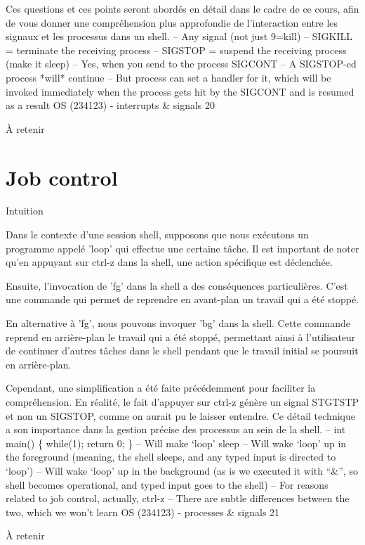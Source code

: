 \documentclass[12pt]{article}
\begin{document}
Ces questions et ces points seront abordés en détail dans le cadre de ce cours, afin de vous donner une compréhension plus approfondie de l'interaction entre les signaux et les processus dans un shell.
– Any signal (not just 9=kill)
– SIGKILL = terminate the receiving process
– SIGSTOP = suspend the receiving process (make it sleep)
– Yes, when you send to the process SIGCONT
– A SIGSTOP-ed process *will* continue
– But process can set a handler for it, which will be invoked immediately
when the process gets hit by the SIGCONT and is resumed as a result
OS (234123) - interrupts \& signals
20
\begin{aretenir}{À retenir}
\end{aretenir}

\section{Job control}
\begin{myvulga}{Intuition}
\end{myvulga}
Dans le contexte d'une session shell, supposons que nous exécutons un programme appelé 'loop' qui effectue une certaine tâche. Il est important de noter qu'en appuyant sur ctrl-z dans la shell, une action spécifique est déclenchée. 

Ensuite, l'invocation de 'fg' dans la shell a des conséquences particulières. C'est une commande qui permet de reprendre en avant-plan un travail qui a été stoppé. 

En alternative à 'fg', nous pouvons invoquer 'bg' dans la shell. Cette commande reprend en arrière-plan le travail qui a été stoppé, permettant ainsi à l'utilisateur de continuer d'autres tâches dans le shell pendant que le travail initial se poursuit en arrière-plan.

Cependant, une simplification a été faite précédemment pour faciliter la compréhension. En réalité, le fait d'appuyer sur ctrl-z génère un signal STGTSTP et non un SIGSTOP, comme on aurait pu le laisser entendre. Ce détail technique a son importance dans la gestion précise des processus au sein de la shell.
– int main() \{ while(1); return 0; \}
– Will make ‘loop’ sleep
– Will wake ‘loop’ up in the foreground (meaning, the shell sleeps, and
any typed input is directed to ‘loop’)
– Will wake ‘loop’ up in the background (as is we executed it with “\&”,
so shell becomes operational, and typed input goes to the shell)
– For reasons related to job control, actually, ctrl-z
– There are subtle differences between the two, which we won’t learn
OS (234123) - processes \& signals
21
\begin{aretenir}{À retenir}
\end{aretenir}
\end{document}

